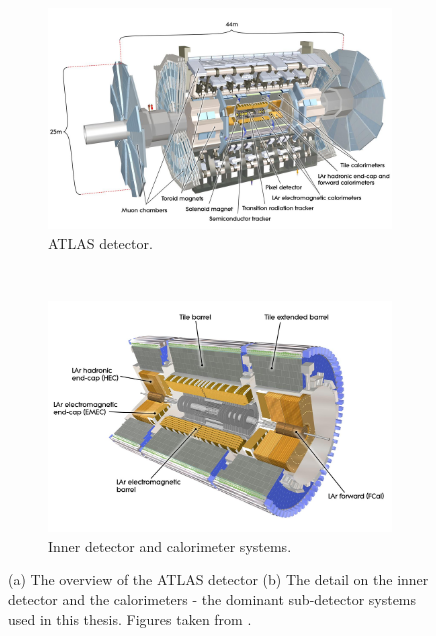 \begin{figure}[p]
  \centering
  \begin{subfigure}[b]{0.9\textwidth}
    \includegraphics[width=\textwidth]{Chapter2/ATLAS.png}
    \caption{ATLAS detector.}
    \label{fig:ATLASfull}
  \end{subfigure}
  ~
  \begin{subfigure}[b]{0.9\textwidth}
    \includegraphics[width=\textwidth]{Chapter2/ATLASinner.jpeg}
    \caption{Inner detector and calorimeter systems.}
    \label{fig:ATLASinner}
  \end{subfigure}
  \caption[(a) The overview of the ATLAS detector 
           (b) The detail on the inner detector and the calorimeters - the dominant
           sub-detector systems used in this thesis.]
           {(a) The overview of the ATLAS detector 
           (b) The detail on the inner detector and the calorimeters - the dominant
           sub-detector systems used in this thesis. Figures taken from
           \cite{CERNbook}.}
  \label{fig:ATLAS}
\end{figure}

